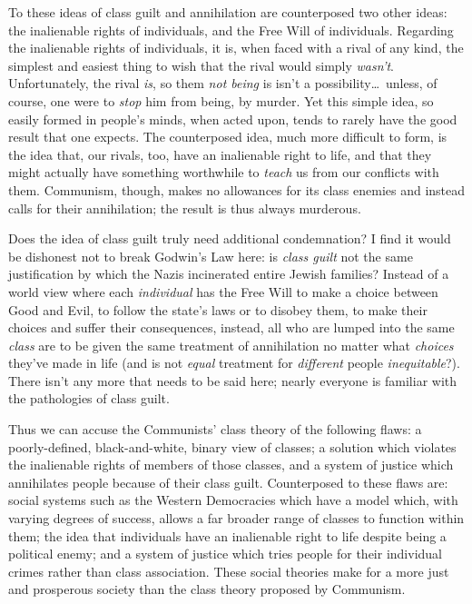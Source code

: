 \documentclass{article}
\begin{document}
To these ideas of class guilt and annihilation are counterposed two other ideas: the inalienable rights of individuals, and the Free Will of individuals.  Regarding the inalienable rights of individuals, it is, when faced with a rival of any kind, the simplest and easiest thing to wish that the rival would simply \emph{wasn't}.  Unfortunately, the rival \emph{is}, so them \emph{not being} is isn't a possibility\ldots~unless, of course, one were to \emph{stop} him from being, by murder.  Yet this simple idea, so easily formed in people's minds, when acted upon, tends to rarely have the good result that one expects.  The counterposed idea, much more difficult to form, is the idea that, our rivals, too, have an inalienable right to life, and that they might actually have something worthwhile to \emph{teach} us from our conflicts with them.  Communism, though, makes no allowances for its class enemies and instead calls for their annihilation; the result is thus always murderous.

Does the idea of class guilt truly need additional condemnation?  I find it would be dishonest not to break Godwin's Law here: is \emph{class guilt} not the same justification by which the Nazis incinerated entire Jewish families?  Instead of a world view where each \emph{individual} has the Free Will to make a choice between Good and Evil, to follow the state's laws or to disobey them, to make their choices and suffer their consequences, instead, all who are lumped into the same \emph{class} are to be given the same treatment of annihilation no matter what \emph{choices} they've made in life (and is not \emph{equal} treatment for \emph{different} people \emph{inequitable}?).  There isn't any more that needs to be said here; nearly everyone is familiar with the pathologies of class guilt.

Thus we can accuse the Communists' class theory of the following flaws: a poorly-defined, black-and-white, binary view of classes; a solution which violates the inalienable rights of members of those classes, and a system of justice which annihilates people because of their class guilt.  Counterposed to these flaws are: social systems such as the Western Democracies which have a model which, with varying degrees of success, allows a far broader range of classes to function within them; the idea that individuals have an inalienable right to life despite being a political enemy; and a system of justice which tries people for their individual crimes rather than class association.  These social theories make for a more just and prosperous society than the class theory proposed by Communism.
\end{document}
